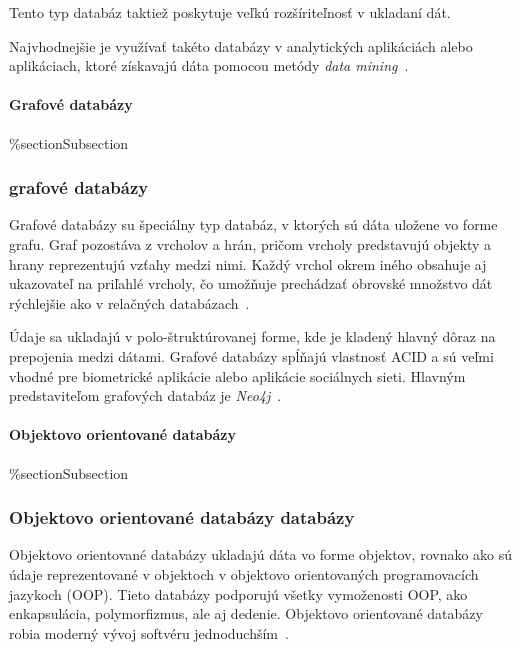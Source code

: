 Tento typ databáz taktiež poskytuje veľkú rozšíriteľnosť v ukladaní dát.

Najvhodnejšie je využívať takéto databázy v analytických aplikáciách alebo aplikáciach, ktoré získavajú dáta pomocou metódy \textit{data mining}~\cite{NoSQLDBvsRealtionDB}.

%
%
{
	\paragraph{Grafové databázy}
}
{
	\%section{Subsection}
	\subsubsection{grafové databázy}
}
\label{subsubsection:graph_db}
Grafové databázy su špeciálny typ databáz, v ktorých sú dáta uložene vo forme grafu. Graf pozostáva z vrcholov a hrán, pričom vrcholy predstavujú objekty a hrany reprezentujú vzťahy medzi nimi. Každý vrchol okrem iného obsahuje aj ukazovateľ na priľahlé vrcholy, čo umožňuje prechádzať obrovské množstvo dát rýchlejšie ako v relačných databázach~\cite{NoSQLDBvsRealtionDB}.

Údaje sa ukladajú v polo-štruktúrovanej forme, kde je kladený hlavný dôraz na prepojenia medzi dátami. Grafové databázy spĺňajú vlastnosť ACID a sú veľmi vhodné pre biometrické aplikácie alebo aplikácie sociálnych sieti. Hlavným predstaviteľom grafových databáz je \textit{Neo4j}~\cite{NoSQLDBvsRealtionDB}.

%
%
{
	\paragraph{Objektovo orientované databázy}
}
{
	\%section{Subsection}
	\subsubsection{Objektovo orientované databázy databázy}
}
\label{subsubsection:object_oriented_db}
Objektovo orientované databázy ukladajú dáta vo forme objektov, rovnako ako sú údaje reprezentované v objektoch v objektovo orientovaných programovacích jazykoch (OOP). Tieto databázy podporujú všetky vymoženosti OOP, ako enkapsulácia, polymorfizmus, ale aj dedenie. Objektovo orientované databázy robia moderný vývoj softvéru jednoduchším~\cite{NoSQLDBvsRealtionDB}.

